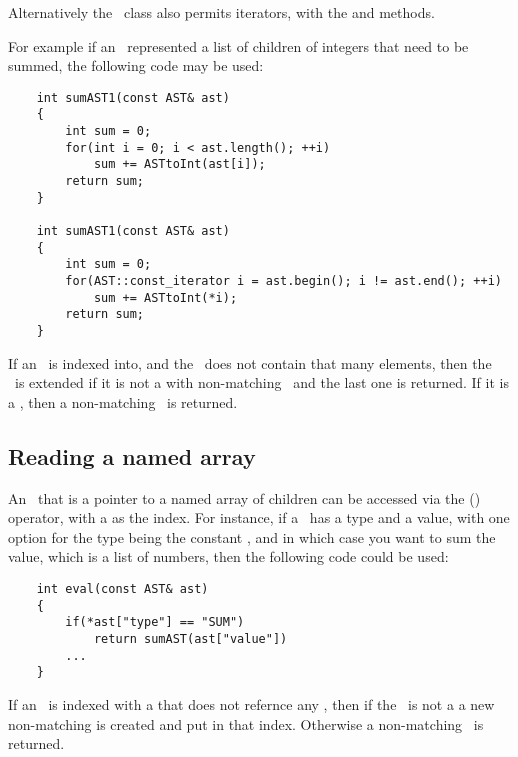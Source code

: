 Alternatively the \AST\ class also permits iterators, with the  and  methods.

For example if an \AST\ represented a list of children of integers that need to be summed,
    the following code may be used:
    \begin{verbatim}
    int sumAST1(const AST& ast)
    {
        int sum = 0;
        for(int i = 0; i < ast.length(); ++i)
            sum += ASTtoInt(ast[i]);
        return sum;
    }
    
    int sumAST1(const AST& ast)
    {
        int sum = 0;
        for(AST::const_iterator i = ast.begin(); i != ast.end(); ++i)
            sum += ASTtoInt(*i);
        return sum;
    }
    \end{verbatim}

If an \AST\ is indexed into, and the \AST\ does not contain that many elements,
    then the \AST\ is extended if it is not a  with non-matching \AST\,
    and the last one is returned.
    If it is a , then a non-matching \AST\ is returned.

\subsection{Reading a named array}
An \AST\ that is a pointer to a named array of children can be accessed via the (\code{[]}) operator,
    with a  as the index.
    For instance, if a \AST\ has a type and a value, with one option for the type being the constant ,
    and in which case you want to sum the value, which is a list of numbers, then the following code could be used:
    \begin{verbatim}
    int eval(const AST& ast)
    {
        if(*ast["type"] == "SUM")
            return sumAST(ast["value"])
        ...
    }
    \end{verbatim}

If an \AST\ is indexed with a  that does not refernce any \AST,
    then if the \AST\ is not a  a new non-matching \AST is created and put in that index.
    Otherwise a non-matching \AST\ is returned.
